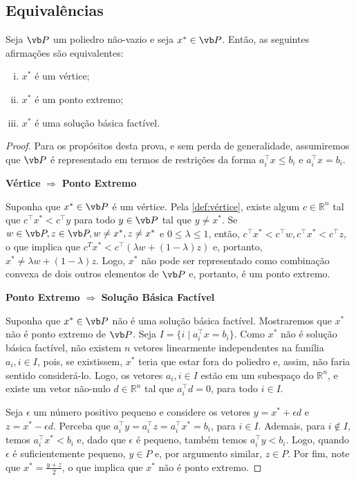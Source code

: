 \subsection{Equivalências}\label{sec:equivalências}

\begin{theorem}
Seja $\vb P$ um poliedro não-vazio e seja $x^*\in \vb P$. Então, as seguintes afirmações são equivalentes:
\begin{enumerate}[(i)]
\item $x^*$ é um vértice;
\item $x^*$ é um ponto extremo;
\item $x^*$ é uma solução básica factível.
\end{enumerate}
\end{theorem}

\begin{proof}
Para os propósitos desta prova, e sem perda de generalidade, assumiremos que $\vb P$ é representado em termos de restrições da forma $a_i^\intercal x \leq b_i$ e $a_i^\intercal x = b_i$.

\textbf{Vértice} $\Rightarrow$ \textbf{Ponto Extremo}

Suponha que $x^*\in \vb P$ é um vértice. Pela \cref{def:vértice}, existe algum $c \in \mathbb{R}^n$ tal que $c^\intercal x^* < c^\intercal y$ para todo $y\in \vb P$ tal que $y\neq x^*$. Se $w\in \vb P, z\in \vb P, w\neq x^*, z\neq x^*$ e $0\leq\lambda\leq1$, então, $c^\intercal x^* < c^\intercal w, c^\intercal x^*<c^\intercal z$, o que implica que $c^{T} x^{*} < c^\intercal (\lambda w + (1-\lambda)z)$ e, portanto, $x^*\neq \lambda w + (1-\lambda) z$. Logo, $x^*$ não pode ser representado como combinação convexa de dois outros elementos de $\vb P$ e, portanto, é um ponto extremo.

\textbf{Ponto Extremo} $\Rightarrow$ \textbf{Solução Básica Factível}

Suponha que $x^*\in \vb P$ não é uma solução básica factível. Mostraremos que $x^*$ não é ponto extremo de $\vb P$. Seja $I = \{i\mid a_i^\intercal x=b_i\}$. Como $x^*$ não é solução básica factível, não existem $n$ vetores linearmente independentes na família $a_i, i\in I$, pois, se existissem, $x^*$ teria que estar fora do poliedro e, assim, não faria sentido considerá-lo. Logo, os vetores $a_i, i \in I$ estão em um subespaço do $\mathbb{R}^n$, e existe um vetor não-nulo $d \in \mathbb{R}^n$ tal que $a_i^\intercal d = 0$, para todo $i \in I$.

Seja $\epsilon$ um número positivo pequeno e considere os vetores $y = x^* + \epsilon d$ e $z = x^* - \epsilon d$. Perceba que $a_i^\intercal y = a_i^\intercal z = a_i^\intercal x^* = b_i$, para $i\in I$. Ademais, para $i\not\in I$, temos $a_i^\intercal x^*<b_i$ e, dado que $\epsilon$ é pequeno, também temos $a_i^\intercal y<b_i$. Logo, quando $\epsilon$ é suficientemente pequeno, $y\in P$ e, por argumento similar, $z\in P$. Por fim, note que $x^* = \frac{y+z}{2}$, o que implica que $x^*$ não é ponto extremo.


\end{proof}
